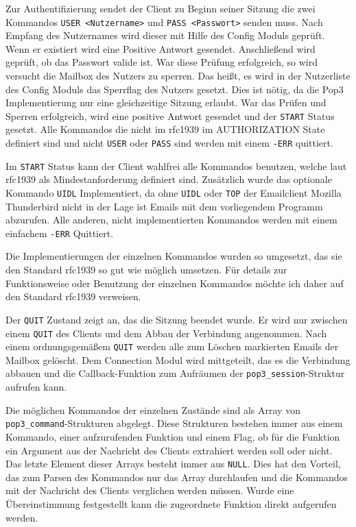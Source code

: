 \documentclass[final,a4paper,11pt,notitlepage,halfparskip]{scrreprt}
\begin{document}
Zur Authentifizierung sendet der Client zu Beginn seiner Sitzung die zwei 
Kommandos \texttt{USER <Nutzername>} und \texttt{PASS <Passwort>} senden muss.
Nach Empfang des Nutzernames wird dieser mit Hilfe des Config Moduls geprüft. 
Wenn er existiert wird eine Positive Antwort gesendet. Anschließend wird 
geprüft, ob das Passwort valide ist. War diese Prüfung erfolgreich, so wird 
versucht die Mailbox des Nutzers zu sperren. Das heißt, es wird in der 
Nutzerliste des Config Moduls das Sperrflag des Nutzers gesetzt. Dies ist 
nötig, da die Pop3 Implementierung nur eine gleichzeitige Sitzung erlaubt. 
War das Prüfen und Sperren erfolgreich, wird eine positive Antwort gesendet und
der \texttt{START} Status gesetzt.
Alle Kommandos die nicht im rfc1939 im AUTHORIZATION State definiert sind und
nicht \texttt{USER} oder \texttt{PASS} sind werden mit einem \texttt{-ERR}
quittiert.

Im \texttt{START} Status kann der Client wahlfrei alle Kommandos benutzen,
welche laut rfc1939 als Mindestanforderung definiert sind. Zusätzlich wurde das
optionale Kommando \texttt{UIDL} Implementiert, da ohne \texttt{UIDL} oder
\texttt{TOP} der Emailclient Mozilla Thunderbird nicht in der Lage ist Emails
mit dem vorliegendem Programm abzurufen. Alle anderen, nicht implementierten
Kommandos werden mit einem einfachem \texttt{-ERR} Quittiert. 

Die Implementierungen der einzelnen Kommandos wurden so umgesetzt, das sie den
Standard rfc1939 so gut wie möglich umsetzen. Für details zur Funktionsweise
oder Benutzung der einzelnen Kommandos möchte ich daher auf den Standard 
rfc1939 verweisen.

Der \texttt{QUIT} Zustand zeigt an, das die Sitzung beendet wurde. Er wird nur
zwischen einem \texttt{QUIT} des Clients und dem Abbau der Verbindung
angenommen. Nach einem ordnungsgemäßem \texttt{QUIT} werden alle zum Löschen
markierten Emails der Mailbox gelöscht. Dem Connection Modul wird mittgeteilt,
das es die Verbindung abbauen und die Callback-Funktion zum Aufräumen der
\texttt{pop3\_session}-Struktur aufrufen kann.

Die möglichen Kommandos der einzelnen Zustände sind als Array von
\texttt{pop3\_command}-Strukturen abgelegt. Diese Strukturen bestehen immer aus
einem Kommando, einer aufzurufenden Funktion und einem Flag, ob für die Funktion
ein Argument aus der Nachricht des Clients extrahiert werden soll oder nicht.
Das letzte Element dieser Arrays besteht immer aus \texttt{NULL}. Dies hat den 
Vorteil, das zum Parsen des Kommandos nur das Array durchlaufen und die 
Kommandos mit der Nachricht des Clients verglichen werden müssen. Wurde eine
Übereinstimmung festgestellt kann die zugeordnete Funktion direkt aufgerufen
werden.
\end{document}
